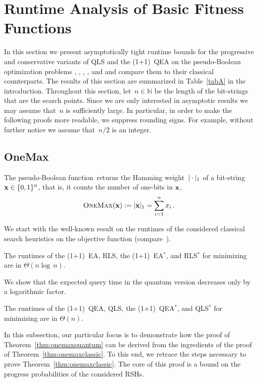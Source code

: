 \documentclass[a4paper,11pt]{article}
\begin{document}
\section{Runtime Analysis of Basic Fitness Functions}
\label{sec:functions}

In this section we present asymptotically tight runtime bounds for the progressive and conservative variants of QLS and the (1+1)~QEA on the pseudo-Boolean optimization problems \onemax, \leadingones, \discrepancy, \needle, and \jumpm and compare them to their classical counterparts. The results of this section are summarized in Table~\ref{tabA} in the introduction. Throughout this section, let~$n\in\mathbb{N}$ be the length of the bit-strings that are the search points. Since we are only interested in asymptotic results we may assume that~$n$ is sufficiently large. In particular, in order to make the following proofs more readable, we suppress rounding signs. For example, without further notice we assume that~$n/2$ is an integer.

\subsection{OneMax}
\label{subsec:onemax}
The pseudo-Boolean function~\onemax returns the Hamming weight~$\vert \cdot\vert_1$ of a bit-string~$\xvec\in\{0,1\}^n$, that is, it counts the number of one-bits in $\xvec$,
\begin{equation}
\onemax(\xvec):=\ham{\xvec}=\sum_{i=1}^n x_i\,.
\end{equation}

We start with the well-known result on the runtimes of the considered classical search heuristics on the objective function \onemax (compare~\cite{djwea02}).
\begin{theorem}\label{thm:onemaxclassic}
The runtimes of the (1+1)~EA, RLS, the (1+1)~EA$^*$, and RLS$^*$ for minimizing \onemax are in $\Theta(n\log\,n)$.
\end{theorem}

We show that the expected query time in the quantum version decreases only by a logarithmic factor.
\begin{theorem}\label{thm:onemaxquantum}
The runtimes of  the (1+1)~QEA, QLS, the (1+1)~QEA$^*$, and QLS$^*$ for minimizing \onemax are in $\Theta(n)$.
\end{theorem}

In this subsection, our particular focus is to demonstrate how the proof of Theorem~\ref{thm:onemaxquantum} can be derived from the ingredients of the proof of Theorem~\ref{thm:onemaxclassic}. To this end, we retrace the steps necessary to prove Theorem~\ref{thm:onemaxclassic}. The core of this proof is a bound on the progress probabilities of the considered RSHs.
\end{document}
